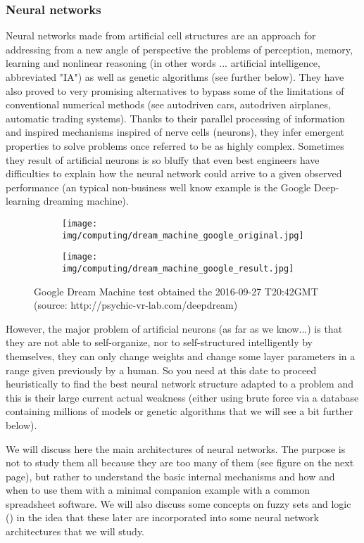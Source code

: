 	\subsubsection{Neural networks}
	Neural networks made from artificial cell structures are an approach for addressing from a new angle of perspective the problems of perception, memory, learning and nonlinear reasoning (in other words ... artificial intelligence, abbreviated "IA") as well as genetic algorithms (see further below). They have also proved to very promising alternatives to bypass some of the limitations of conventional numerical methods (see autodriven cars, autodriven airplanes, automatic trading systems). Thanks to their parallel processing of information and inspired mechanisms inspired of nerve cells (neurons), they infer emergent properties to solve problems once referred to be as highly complex. Sometimes they result of artificial neurons is so bluffy that even best engineers have difficulties to explain how the neural network could arrive to a given observed performance (an typical non-business well know example is the Google Deep-learning dreaming machine).
	\begin{figure}[H]
		\centering
		\begin{subfigure}{.5\textwidth}
		  \centering
		  \texttt{[image: img/computing/dream\_machine\_google\_original.jpg]}
		\end{subfigure}%
		\begin{subfigure}{.5\textwidth}
		  \centering
		  \texttt{[image: img/computing/dream\_machine\_google\_result.jpg]}
		\end{subfigure}
		\caption{Google Dream Machine test obtained the 2016-09-27 T20:42GMT (source: http://psychic-vr-lab.com/deepdream)}
	\end{figure}

	However, the major problem of artificial neurons (as far as we know...) is that they are not able to self-organize, nor to self-structured intelligently by themselves, they can only change weights and change some layer parameters in a range given previously by a human. So you need at this date to proceed heuristically to find the best neural network structure adapted to a problem and this is their large current actual weakness (either using brute force via a database containing millions of models or genetic algorithms that we will see a bit further below).
	
	We will discuss here the main architectures of neural networks. The purpose is not to study them all because they are too many of them (see figure on the next page), but rather to understand the basic internal mechanisms and how and when to use them with a minimal companion example with a common spreadsheet software. We will also discuss some concepts on fuzzy sets and logic () in the idea that these later are incorporated into some neural network architectures that we will study.
	
